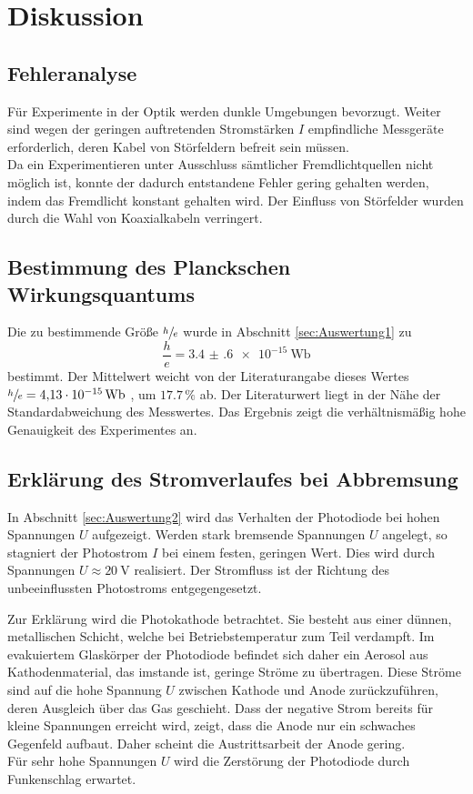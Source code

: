 \section{Diskussion}
\label{sec:Diskussion}
\subsection{Fehleranalyse} %
\label{sub:Diskussion1}
Für Experimente in der Optik werden dunkle Umgebungen bevorzugt.
Weiter sind wegen der geringen auftretenden Stromstärken $I$ empfindliche Messgeräte erforderlich, deren Kabel von Störfeldern befreit sein müssen.\\
Da ein Experimentieren unter Ausschluss sämtlicher Fremdlichtquellen nicht möglich ist, konnte der dadurch entstandene Fehler gering gehalten werden, indem das Fremdlicht konstant gehalten wird.
Der Einfluss von Störfelder wurden durch die Wahl von Koaxialkabeln verringert.
\subsection{Bestimmung des Planckschen Wirkungsquantums} %
\label{sub:Diskussion2}
Die zu bestimmende Größe $\sfrac{h}{e}$ wurde in Abschnitt \ref{sec:Auswertung1} zu 
\begin{equation}
	\frac{h}{e}=\SI{3.4(6)e-15}{\weber}
\end{equation}
bestimmt.
Der Mittelwert weicht von der Literaturangabe dieses Wertes \\
$\sfrac{h}{e}=\SI{4.13e-15}{\weber}$ \cite{texas_instruments1},\cite{texas_instruments2} um $17.7\,\%$ 
ab. Der Literaturwert liegt in der Nähe der Standardabweichung des Messwertes.
Das Ergebnis zeigt die verhältnismäßig hohe Genauigkeit des Experimentes an.
\subsection{Erklärung des Stromverlaufes bei Abbremsung} %
\label{sub:Diskussion3}
In Abschnitt \ref{sec:Auswertung2} wird das Verhalten der Photodiode bei hohen Spannungen $U$ aufgezeigt.
Werden stark bremsende Spannungen $U$ angelegt, so stagniert der Photostrom $I$ bei einem festen, geringen Wert.
Dies wird durch Spannungen $U\approx\SI{20}{\volt}$ realisiert.
Der Stromfluss ist der Richtung des unbeeinflussten Photostroms entgegengesetzt.

Zur Erklärung wird die Photokathode betrachtet. 
Sie besteht aus einer dünnen, metallischen Schicht, welche bei Betriebstemperatur zum Teil verdampft.
Im evakuiertem Glaskörper der Photodiode befindet sich daher ein Aerosol aus Kathodenmaterial, das imstande ist, 
geringe Ströme zu übertragen. 
Diese Ströme sind auf die hohe Spannung $U$ zwischen Kathode und Anode zurückzuführen, deren Ausgleich über das Gas geschieht.
Dass der negative Strom bereits für kleine Spannungen erreicht wird, zeigt, dass die Anode nur ein schwaches Gegenfeld aufbaut.
Daher scheint die Austrittsarbeit der Anode gering.\\
Für sehr hohe Spannungen $U$ wird die Zerstörung der Photodiode durch Funkenschlag erwartet.

